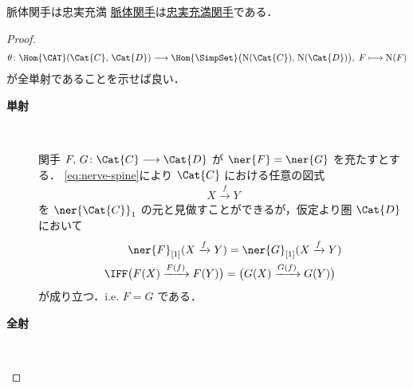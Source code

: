\documentclass[TQFT_main]{subfiles}
\begin{document}
\begin{myprop}[label=def:nerve]{脈体関手は忠実充満}
    \hyperref[def:nerve]{脈体関手}は\hyperref[def:faithful]{忠実充満関手}である．
\end{myprop}
\begin{proof}
    \begin{align}
        \theta \colon \Hom{\CAT}(\Cat{C},\, \Cat{D}) \lto \Hom{\SimpSet} \bigl( \mathrm{N}(\Cat{C}),\, \mathrm{N}(\Cat{D}) \bigr),\; F \lmto \mathrm{N}(F)
    \end{align}
    が全単射であることを示せば良い．

    \begin{description}
        \item[\textbf{単射}]　
        
        関手 $F,\, G \colon \Cat{C} \lto \Cat{D}$ が $\ner{F} = \ner{G}$ を充たすとする．
        \eqref{eq:nerve-spine}により $\Cat{C}$ における任意の図式
        \begin{align}
            X \xrightarrow{f} Y
        \end{align}
        を $\ner{\Cat{C}}_1$ の元と見做すことができるが，仮定より圏 $\Cat{D}$ において
        \begin{align}
            &\ner{F}_{[1]}(X \xrightarrow{f} Y) = \ner{G}_{[1]}(X \xrightarrow{f} Y) \\
            \IFF & \bigl(F(X) \xrightarrow{F(f)} F(Y)\bigr) =  \bigl(G(X) \xrightarrow{G(f)} G(Y)\bigr)
        \end{align}
        が成り立つ．i.e. $F = G$ である．
        \item[\textbf{全射}]　
        

\end{description}
\end{proof}
\end{document}
